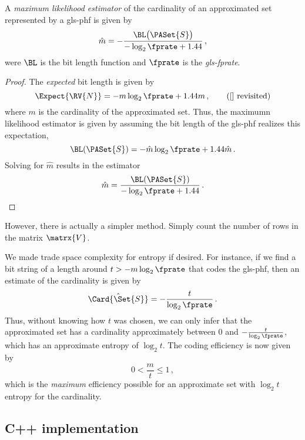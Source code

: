 \documentclass[ ../main.tex]{subfiles}
\begin{document}
\begin{theorem}
A \emph{maximum likelihood estimator} of the cardinality of an approximated set represented by a \gls{gls-phf} is given by
\begin{equation}
    \hat{m} = -\frac{\BL\!\left(\PASet{S}\right)}{-\log_2 \fprate + 1.44}\,,
\end{equation}
were $\BL$ is the bit length function and $\fprate$ is the \emph{\gls{gls-fprate}}.
\end{theorem}
\begin{proof}
The \emph{expected} bit length is given by
\begin{equation*}
    \Expect{\RV{N}} = -m \log_2 \fprate + 1.44 m\,, 
    \tag{\ref{} revisited}
\end{equation*}
where $m$ is the cardinality of the approximated set. Thus, the maximumn likelihood estimator is given by assuming the bit length of the \gls{gls-phf} realizes this expectation,
\begin{equation}
    \BL(\PASet{S}) = -\hat{m} \log_2 \fprate + 1.44 \hat{m}\,.
\end{equation}
Solving for $\hat{m}$ results in the estimator
\begin{equation}
    \hat{m} = \frac{\BL(\PASet{S})}{-\log_2 \fprate + 1.44}\,.
\end{equation}
\end{proof}
However, there is actually a simpler method. Simply count the number of rows in the matrix $\matrx{V}$.

We made trade space complexity for entropy if desired. For instance, if we find a bit string of a length around $t > -m \log_2 \fprate$ that codes the \gls{gls-phf}, then an estimate of the cardinality is given by
\begin{equation}
    \hat{\Card{\Set{S}}} = -\frac{t}{\log_2 \fprate}\,.
\end{equation}
Thus, without knowing how $t$ was chosen, we can only infer that the approximated set has a cardinality approximately between $0$ and $-\frac{t}{\log_2 \fprate}$, which has an approximate entropy of $\log_2 t$. The coding efficiency is now given by
\begin{equation}
    0 < \frac{m}{t} \leq 1\,,
\end{equation}
which is the \emph{maximum} efficiency possible for an approximate set with $\log_2 t$ entropy for the cardinality.

\subsection{C++ implementation}
%
\end{document}
